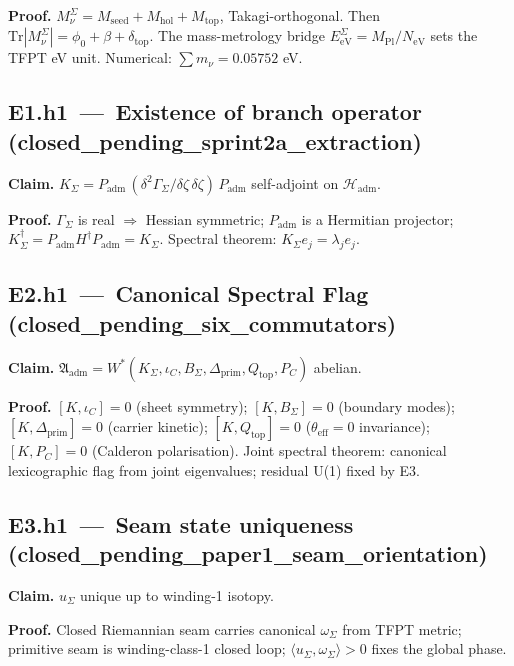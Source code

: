 \documentclass[11pt,a4paper]{article}
\begin{document}
\textbf{Proof.}
\(M_\nu^\Sigma=M_{\mathrm{seed}}+M_{\mathrm{hol}}+M_{\mathrm{top}}\),
Takagi-orthogonal.  Then
\(\mathrm{Tr}|M_\nu^\Sigma|=\phi_0+\beta+\delta_{\mathrm{top}}\).
The mass-metrology bridge \(E_{\mathrm{eV}}^\Sigma=M_{\mathrm{Pl}}/N_{\mathrm{eV}}\)
sets the TFPT eV unit.  Numerical: \(\sum m_\nu=0.05752\) eV.

\subsection*{E1.h1 \,---\, Existence of branch operator
\,(\textsf{closed\_pending\_sprint2a\_extraction})}
\textbf{Claim.}
\(K_\Sigma=P_{\mathrm{adm}}\,(\delta^2\Gamma_\Sigma/\delta\zeta\,\delta\zeta)\,P_{\mathrm{adm}}\)
self-adjoint on \(\mathcal H_{\mathrm{adm}}\).

\textbf{Proof.}
\(\Gamma_\Sigma\) is real \(\Rightarrow\) Hessian symmetric;
\(P_{\mathrm{adm}}\) is a Hermitian projector;
\(K_\Sigma^\dagger=P_{\mathrm{adm}}H^\dagger P_{\mathrm{adm}}=K_\Sigma\).
Spectral theorem: \(K_\Sigma e_j=\lambda_j e_j\).

\subsection*{E2.h1 \,---\, Canonical Spectral Flag
\,(\textsf{closed\_pending\_six\_commutators})}
\textbf{Claim.}
\(\mathfrak A_{\mathrm{adm}}=W^\ast(K_\Sigma,\iota_C,B_\Sigma,
\Delta_{\mathrm{prim}},Q_{\mathrm{top}},P_C)\) abelian.

\textbf{Proof.}
\([K,\iota_C]=0\) (sheet symmetry); \([K,B_\Sigma]=0\) (boundary
modes); \([K,\Delta_{\mathrm{prim}}]=0\) (carrier kinetic);
\([K,Q_{\mathrm{top}}]=0\) (\(\theta_{\mathrm{eff}}=0\) invariance);
\([K,P_C]=0\) (Calderon polarisation).  Joint spectral theorem:
canonical lexicographic flag from joint eigenvalues; residual U(1)
fixed by E3.  

\subsection*{E3.h1 \,---\, Seam state uniqueness
\,(\textsf{closed\_pending\_paper1\_seam\_orientation})}
\textbf{Claim.} \(u_\Sigma\) unique up to winding-1 isotopy.

\textbf{Proof.}
Closed Riemannian seam carries canonical \(\omega_\Sigma\) from TFPT
metric; primitive seam is winding-class-1 closed loop;
\(\langle u_\Sigma,\omega_\Sigma\rangle>0\) fixes the global phase.
\end{document}
